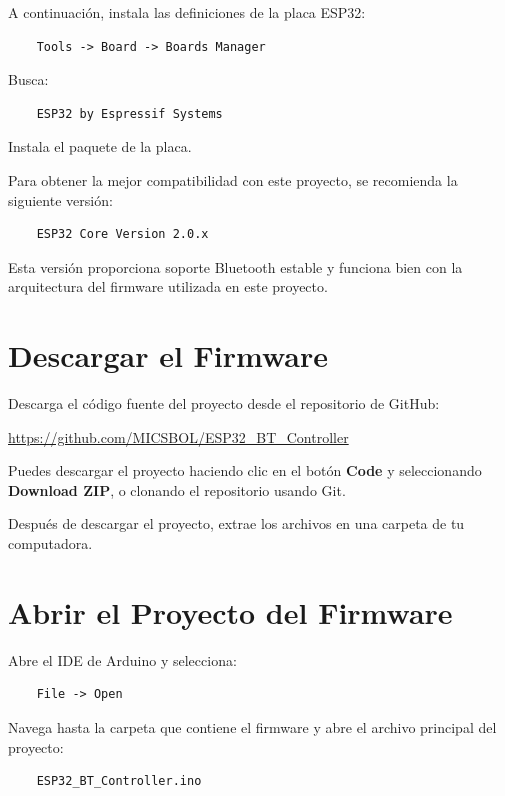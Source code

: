 A continuación, instala las definiciones de la placa ESP32:

\begin{verbatim}
    Tools -> Board -> Boards Manager
\end{verbatim}

Busca:

\begin{verbatim}
    ESP32 by Espressif Systems
\end{verbatim}

Instala el paquete de la placa.

Para obtener la mejor compatibilidad con este proyecto, se recomienda la siguiente versión:

\begin{verbatim}
    ESP32 Core Version 2.0.x
\end{verbatim}

Esta versión proporciona soporte Bluetooth estable y funciona bien con la arquitectura del firmware utilizada en este proyecto.

\section{Descargar el Firmware}

Descarga el código fuente del proyecto desde el repositorio de GitHub:

\begin{center}
    \url{https://github.com/MICSBOL/ESP32_BT_Controller}
\end{center}

Puedes descargar el proyecto haciendo clic en el botón \textbf{Code} y seleccionando \textbf{Download ZIP},
o clonando el repositorio usando Git.

Después de descargar el proyecto, extrae los archivos en una carpeta de tu computadora.

\section{Abrir el Proyecto del Firmware}

Abre el IDE de Arduino y selecciona:

\begin{verbatim}
    File -> Open
\end{verbatim}

Navega hasta la carpeta que contiene el firmware y abre el archivo principal del proyecto:

\begin{verbatim}
    ESP32_BT_Controller.ino
\end{verbatim}

